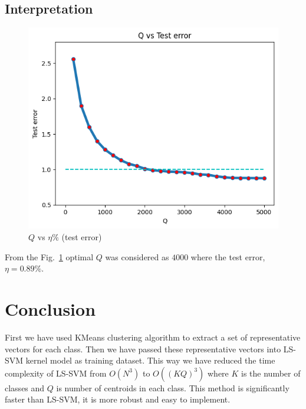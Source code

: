 \documentclass[conference]{IEEEtran}
\begin{document}
    \subsection{Interpretation}
       \begin{figure}[htbp]
            \centering
            \includegraphics[scale=0.6]{output.png} %
            \caption{$Q$ vs $\eta\%$ (test error)}
            \label{fig}
        \end{figure}

    From the Fig.~\ref{fig} optimal $Q$ was considered as $4000$ where the test error, $\eta = 0.89\%$.

    \section{Conclusion}\label{sec:conclusion}
    First we have used KMeans clustering algorithm to extract a set of representative vectors for each class.
    Then we have passed these representative vectors into LS-SVM kernel model as training dataset.
    This way we have reduced the time complexity of LS-SVM from $O(N^3)$ to $O((KQ)^3)$ where $K$ is the number of classes and $Q$ is number of centroids in each class.
    This method is significantly faster than LS-SVM, it is more robust and easy to implement.
\end{document}
